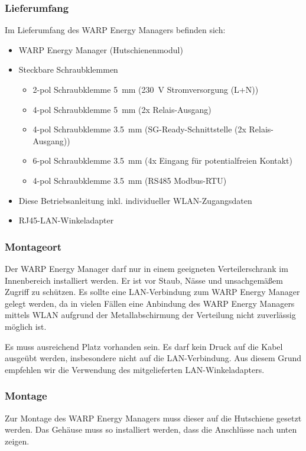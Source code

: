 \documentclass[a4paper,10pt]{article}
\begin{document}
\begin{multicols*}{2}
	\subsubsection{Lieferumfang}
	Im Lieferumfang des WARP Energy Managers befinden sich:
	\begin{itemize}
		\item WARP Energy Manager (Hutschienenmodul)
		\item Steckbare Schraubklemmen
		\begin{itemize}
			\item 2-pol Schraubklemme \SI{5}{\milli\meter} (\SI{230}{\volt} Stromversorgung (L+N))
			\item 4-pol Schraubklemme \SI{5}{\milli\meter} (2x Relais-Ausgang)
			\item 4-pol Schraubklemme \SI{3.5}{\milli\meter} (SG-Ready-Schnittstelle (2x Relais-Ausgang))
			\item 6-pol Schraubklemme \SI{3.5}{\milli\meter} (4x Eingang für potentialfreien Kontakt)
			\item 4-pol Schraubklemme \SI{3.5}{\milli\meter} (RS485 Modbus-RTU)
		\end{itemize}
		\item Diese Betriebsanleitung inkl. individueller WLAN-Zugangsdaten
		\item RJ45-LAN-Winkeladapter
	\end{itemize}

	\subsubsection{Montageort}
	Der WARP Energy Manager darf nur in einem geeigneten Verteilerschrank im
	Innenbereich installiert werden. Er ist vor Staub, Nässe und unsachgemäßem
	Zugriff zu schützen. Es sollte
	eine LAN-Verbindung zum WARP Energy Manager gelegt werden, da in vielen
	Fällen eine Anbindung des WARP Energy Managers mittels WLAN aufgrund
	der Metallabschirmung der Verteilung nicht zuverlässig möglich ist.

	Es muss ausreichend Platz vorhanden sein. Es darf kein Druck auf die Kabel
	ausgeübt werden, insbesondere nicht auf die LAN-Verbindung. Aus diesem Grund
	empfehlen wir die Verwendung des mitgelieferten LAN-Winkeladapters.

	\subsubsection{Montage}
	Zur Montage des WARP Energy Managers muss dieser auf die Hutschiene
	gesetzt werden. Das Gehäuse muss so installiert werden, dass die Anschlüsse
	nach unten zeigen.


\end{multicols*}
\end{document}
